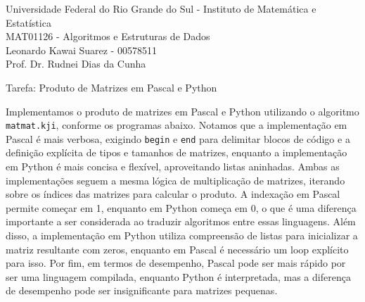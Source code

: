 \documentclass{article}
\begin{document}
\begin{flushleft}
    Universidade Federal do Rio Grande do Sul - Instituto de Matemática e Estatística \\
    MAT01126 - Algoritmos e Estruturas de Dados \\
    Leonardo Kawai Suarez - 00578511 \\
    Prof. Dr. Rudnei Dias da Cunha
\end{flushleft}

\begin{center}
    \large{Tarefa: Produto de Matrizes em Pascal e Python}
\end{center}

Implementamos o produto de matrizes em Pascal e Python utilizando o algoritmo \texttt{matmat.kji}, conforme os programas abaixo. Notamos que a implementação em Pascal é mais verbosa, exigindo \texttt{begin} e \texttt{end} para delimitar blocos de código e a definição explícita de tipos e tamanhos de matrizes, enquanto a implementação em Python é mais concisa e flexível, aproveitando listas aninhadas. Ambas as implementações seguem a mesma lógica de multiplicação de matrizes, iterando sobre os índices das matrizes para calcular o produto. A indexação em Pascal permite começar em 1, enquanto em Python começa em 0, o que é uma diferença importante a ser considerada ao traduzir algoritmos entre essas linguagens. Além disso, a implementação em Python utiliza compreensão de listas para inicializar a matriz resultante com zeros, enquanto em Pascal é necessário um loop explícito para isso. Por fim, em termos de desempenho, Pascal pode ser mais rápido por ser uma linguagem compilada, enquanto Python é interpretada, mas a diferença de desempenho pode ser insignificante para matrizes pequenas.
\end{document}
